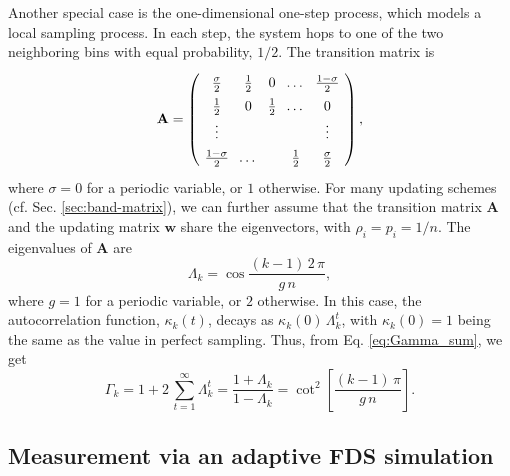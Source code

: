 \documentclass[reprint, superscriptaddress, floatfix]{revtex4-1}
\begin{document}
Another special case is the
one-dimensional one-step process\cite{vankampen},
which models a local sampling process.
In each step, the system hops to
one of the two neighboring bins
with equal probability, $1/2$.
%
The transition matrix is
%
\begin{equation}
  \arraycolsep=3.6pt\def\arraystretch{1.4}
  \mathbf A
  =
  \left(
    \begin{array}{cccccccc}
      \frac \sigma 2 & \frac 1 2 & 0 & \dots & \frac {1 - \sigma} 2 \\
      \frac 1 2 & 0         & \frac 1 2 & \dots & 0 \\
      \vdots & &  & & \vdots \\
      \frac {1 - \sigma} 2 & \dots &  & \frac 1 2 & \frac \sigma 2
    \end{array}
  \right),
\notag
\end{equation}
%
where $\sigma = 0$ for a periodic variable, or $1$ otherwise.
%
For many updating schemes
(cf. Sec. \ref{sec:band-matrix}),
we can further assume that
the transition matrix $\mathbf A$ and
the updating matrix $\mathbf w$
share the eigenvectors,
with $\rho_i = p_i = 1/n$.
%
The eigenvalues of $\mathbf A$ are
$$
  \Lambda_k
  =
  \cos \frac{ (k - 1) \, 2 \, \pi }
            {       g \, n        }
  ,
$$
where
$g = 1$ for a periodic variable, or $2$ otherwise.
%
In this case,
the autocorrelation function, $\kappa_k(t)$,
decays as $\kappa_k(0) \, \Lambda_k^t$,
with $\kappa_k(0) = 1$ being the same as
the value in perfect sampling.
%
Thus,
from Eq. \eqref{eq:Gamma_sum}, we get
%
\begin{equation}
  \Gamma_k
  =
  1 + 2 \, \sum_{t = 1}^\infty \Lambda_k^t
  =
  \frac{ 1 + \Lambda_k }
       { 1 - \Lambda_k }
  =
  \cot^2 \left[
    \frac{ (k - 1) \, \pi }
         {       g \, n   }
  \right]
  .
\label{eq:Gamma_onestep}
\end{equation}


\subsection{\label{sec:Gamma_measure}
Measurement via an adaptive FDS simulation
}
\end{document}
